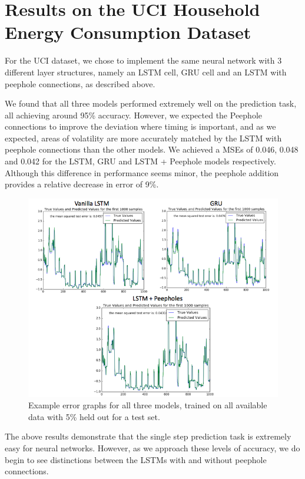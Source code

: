 \documentclass{article} %
\begin{document}
\section{Results on the UCI Household Energy Consumption Dataset}
\label{sec:house}

For the UCI dataset, we chose to implement the same neural network with 3 different layer structures, namely an LSTM cell, GRU cell and an LSTM with peephole connections, as described above. 

We found that all three models performed extremely well on the prediction task, all achieving around 95\% accuracy. However, we expected the Peephole connections to improve the deviation where timing is important, and as we expected, areas of volatility are more accurately matched by the LSTM with peephole connections than the other models. We achieved a MSEs of 0.046, 0.048 and 0.042 for the LSTM, GRU and LSTM + Peephole models respectively. Although this difference in performance seems minor, the peephole addition provides a relative decrease in error of 9\%. 

\begin{figure}[H]
\begin{center}
\includegraphics[scale=0.6]{FullTrainingAllModels.png}	
\end{center}
\caption{Example error graphs for all three models, trained on all available data with 5\% held out for a test set.}
\label{fig:energy/results}
\end{figure}


The above results demonstrate that the single step prediction task is extremely easy for neural networks. However, as we approach these levels of accuracy, we do begin to see distinctions between the LSTMs with and without peephole connections. 
\end{document}
